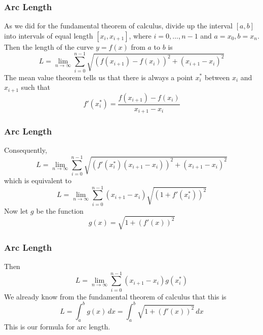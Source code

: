 \documentclass[xcolor=dvipsnames]{beamer}
\begin{document}
\begin{frame}
  \frametitle{Arc Length}
  As we did for the fundamental theorem of calculus, divide up the
  interval $[a,b]$ into intervals of equal length $[x_{i},x_{i+1}]$,
  where $i=0,\ldots,n-1$ and $a=x_{0},b=x_{n}$. Then the length of the
  curve $y=f(x)$ from $a$ to $b$ is
  \begin{equation}
    \label{eq:eeyohpha}
    L=\lim_{n\rightarrow\infty}\sum_{i=0}^{n-1}\sqrt{\left(f(x_{i+1})-f(x_{i})\right)^{2}+\left(x_{i+1}-x_{i}\right)^{2}}
  \end{equation}
The mean value theorem tells us that there is always a point
$x_{i}^{\ast}$ between $x_{i}$ and $x_{i+1}$ such that
\begin{equation}
  \label{eq:oshachie}
  f'(x_{i}^{\ast})=\frac{f(x_{i+1})-f(x_{i})}{x_{i+1}-x_{i}}
\end{equation}
\end{frame}

\begin{frame}
  \frametitle{Arc Length}
Consequently,
  \begin{equation}
    \label{eq:ahchoode}
    L=\lim_{n\rightarrow\infty}\sum_{i=0}^{n-1}\sqrt{\left(f'(x_{i}^{\ast})\left(x_{i+1}-x_{i}\right)\right)^{2}+\left(x_{i+1}-x_{i}\right)^{2}}
  \end{equation}
which is equivalent to
\begin{equation}
  \label{eq:jooquaiw}
    L=\lim_{n\rightarrow\infty}\sum_{i=0}^{n-1}\left(x_{i+1}-x_{i}\right)\sqrt{\left(1+f'(x_{i}^{\ast})\right)^{2}}
\end{equation}
Now let $g$ be the function
\begin{equation}
  \label{eq:eicahdei}
  g(x)=\sqrt{1+\left(f'(x)\right)^{2}}
\end{equation}
\end{frame}

\begin{frame}
  \frametitle{Arc Length}
Then
\begin{equation}
  \label{eq:geiphofi}
    L=\lim_{n\rightarrow\infty}\sum_{i=0}^{n-1}\left(x_{i+1}-x_{i}\right)g(x_{i}^{\ast})
\end{equation}
We already know from the fundamental theorem of calculus that this is
\begin{equation}
  \label{eq:yemaezov}
    L=\int_{a}^{b}g(x)\,dx=\int_{a}^{b}\sqrt{1+\left(f'(x)\right)^{2}}\,dx
\end{equation}
This is our \alert{formula for arc length}.
\end{frame}
\end{document}
